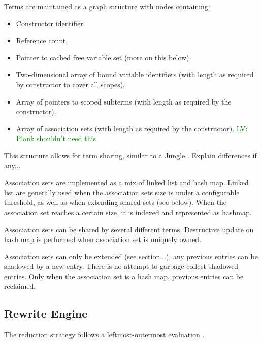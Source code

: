 \documentclass[letterpaper,11pt]{article}
\newcommand{\LV}[1]{\textcolor{green}{LV: #1}}
\begin{document}
\begin{structure}
  Terms are maintained as a graph structure with nodes containing:
  \begin{itemize}
  \item Constructor identifier.
  \item Reference count.
  \item Pointer to cached free variable set (more on this below).
  \item Two-dimensional array of bound variable identifiers (with length as required by constructor to cover all
    scopes). 
  \item Array of pointers to scoped subterms (with length as required by the constructor).
  \item Array of association sets (with length as required by the constructor). \LV{Plank shouldn't need this}
  \end{itemize}
\end{structure}

This structure allows for term sharing, similar to a Jungle \cite{Hoffmann91implementingterm}. Explain differences if any...

\begin{structure}
  Association sets are implemented as a mix of linked list and hash map. Linked list are generally used when the association sets size is under a
  configurable threshold, as well as when extending shared sets (see below). When the association set reaches a certain size, it is indexed 
  and represented as hashmap. 
  
  Association sets can be shared by several different terms. Destructive update on hash map is performed when association set is uniquely owned. 
  
  Association sets can only be extended (see section...), any previous entries can be shadowed by a new entry. There is no attempt to
  garbage collect shadowed entries. Only when the association set is a hash map, previous entries can be reclaimed.
  
\end{structure}

\subsection{Rewrite Engine}

The reduction strategy follows a leftmost-outermost evaluation \cite{Toyama05reductionstrategies}. 
 
\end{document}
